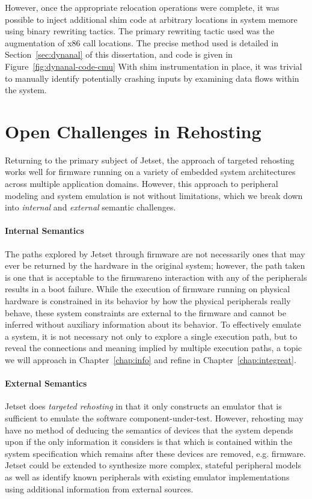 However, once the appropriate relocation operations were complete, it was possible to inject additional shim code at arbitrary locations in system memore using binary rewriting tactics.
The primary rewriting tactic used was the augmentation of x86 call locations.
The precise method used is detailed in Section~\ref{sec:dynanal} of this dissertation, and code is given in Figure~\ref{fig:dynanal-code-cmu}
With shim instrumentation in place, it was trivial to manually identify potentially crashing inputs by examining data flows within the system.

\section{Open Challenges in Rehosting} 
\label{sec:jetset-limitations}

Returning to the primary subject of Jetset, the approach of targeted rehosting works well for firmware running on a variety of embedded system architectures across multiple application domains. 
However, this approach to peripheral modeling and system emulation is not without limitations, which we break down into \emph{internal} and \emph{external} semantic challenges.

\paragraph{Internal Semantics}
The paths explored by Jetset through firmware are not necessarily ones that may ever be returned by the hardware in the original system; however, the path taken is one that is acceptable to the firmware\textemdash no interaction with any of the peripherals results in a boot failure.
While the execution of firmware running on physical hardware is constrained in its behavior by how the physical peripherals really behave, these system constraints are external to the firmware and cannot be inferred without auxiliary information about its behavior.
To effectively emulate a system, it is not necessary not only to explore a single execution path, but to reveal the connections and meaning implied by multiple execution paths, a topic we will approach in Chapter~\ref{chap:info} and refine in Chapter~\ref{chap:integreat}.

\paragraph{External Semantics}
Jetset does \textit{targeted rehosting} in that it only constructs an emulator that is sufficient to emulate the software component-under-test.
However, rehosting may have no method of deducing the semantics of devices that the system depends upon if the only information it considers is that which is contained within the system specification which remains after these devices are removed, e.g. firmware.
Jetset could be extended to synthesize more complex, stateful peripheral models as well as identify known peripherals with existing emulator implementations using additional information from external sources.

